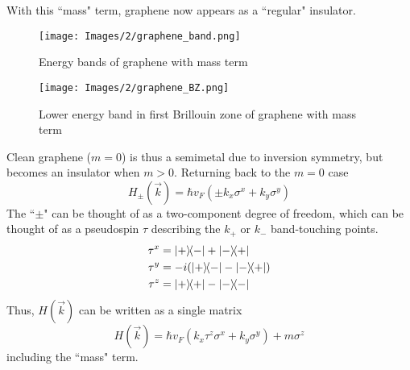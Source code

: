 \documentclass[12pt,a4paper,titlepage]{article}
\begin{document}
With this ``mass" term, graphene now appears as a ``regular" insulator. 
\begin{center}
\end{center}
\begin{figure}[H]
	\centering
	\texttt{[image: Images/2/graphene\_band.png]}
	\caption{Energy bands of graphene with mass term}
\end{figure}
\begin{figure}[H]
	\centering
	\texttt{[image: Images/2/graphene\_BZ.png]}
	\caption{Lower energy band in first Brillouin zone of graphene with mass term}
\end{figure}
Clean graphene ($m=0$) is thus a semimetal due to inversion symmetry, but becomes an insulator when $m>0$. Returning back to the $m=0$ case
\begin{equation}
H_{\pm}(\vec{k})=\hbar v_{F}(\pm k_{x}\sigma^{x}+k_{y}\sigma^{y})
\end{equation}
The ``$\pm$" can be thought of as a two-component degree of freedom, which can be thought of as a pseudospin $\tau$ describing the $k_{+}$ or $k_{-}$ band-touching points.
\begin{equation}
\begin{aligned}
\tau^{x}&=\ketbra{+}{-}+\ketbra{-}{+}\\
\tau^{y}&=-i(\ketbra{+}{-}-\ketbra{-}{+})\\
\tau^{z}&=\ketbra{+}{+}-\ketbra{-}{-}
\end{aligned}
\end{equation}
Thus, $H(\vec{k})$ can be written as a single matrix
\begin{equation}
H(\vec{k})=\hbar v_{F}(k_{x}\tau^{z}\sigma^{x}+k_{y}\sigma^{y})+m\sigma^{z}
\end{equation}
including the ``mass" term.
\end{document}

